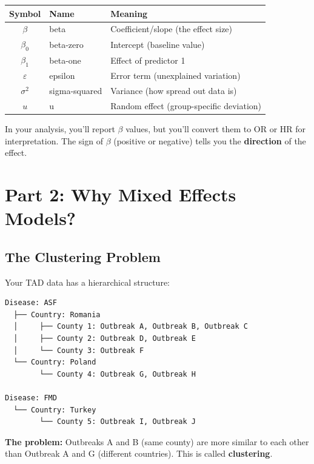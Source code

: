 \documentclass[11pt,a4paper]{article}
\begin{document}
\begin{table}[h]
\centering
\begin{tabular}{@{}clp{8cm}@{}}
\toprule
\textbf{Symbol} & \textbf{Name} & \textbf{Meaning} \\
\midrule
$\beta$ & beta & Coefficient/slope (the effect size) \\
$\beta_0$ & beta-zero & Intercept (baseline value) \\
$\beta_1$ & beta-one & Effect of predictor 1 \\
$\varepsilon$ & epsilon & Error term (unexplained variation) \\
$\sigma^2$ & sigma-squared & Variance (how spread out data is) \\
$u$ & u & Random effect (group-specific deviation) \\
\bottomrule
\end{tabular}
\end{table}

\begin{keypoint}
In your analysis, you'll report $\beta$ values, but you'll convert them to OR or HR for interpretation. The sign of $\beta$ (positive or negative) tells you the \textbf{direction} of the effect.
\end{keypoint}

\section{Part 2: Why Mixed Effects Models?}

\subsection{The Clustering Problem}

Your TAD data has a hierarchical structure:

\begin{verbatim}
Disease: ASF
  ├── Country: Romania
  │     ├── County 1: Outbreak A, Outbreak B, Outbreak C
  │     ├── County 2: Outbreak D, Outbreak E
  │     └── County 3: Outbreak F
  └── Country: Poland
        └── County 4: Outbreak G, Outbreak H
        
Disease: FMD
  └── Country: Turkey
        └── County 5: Outbreak I, Outbreak J
\end{verbatim}

\textbf{The problem:} Outbreaks A and B (same county) are more similar to each other than Outbreak A and G (different countries). This is called \textbf{clustering}.
\end{document}

